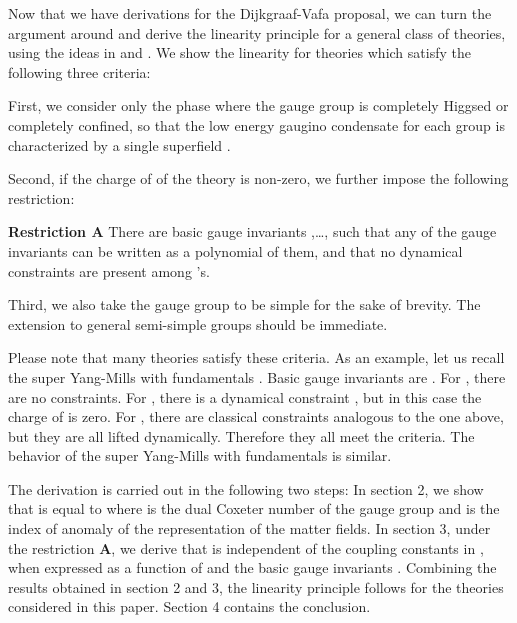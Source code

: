 \documentclass[a4paper,12pt]{article}
\def\ex#1{\langle#1\rangle}
\def\W#1{W_{\text{#1}}}
\def\Pf{\mathop{\text{Pf}}}
\begin{document}
Now that we have derivations for the Dijkgraaf-Vafa proposal,
we can turn the argument around and 
derive the linearity principle 
for a general class of theories,
using the ideas in \cite{Dijkgraaf:2002xd} and
\cite{Cachazo:2002ry}.
We show the linearity for theories which
satisfy the following three criteria:

First, we consider only the phase where the gauge group is completely Higgsed
or completely confined, so that the low energy gaugino condensate
for each group is characterized by a single superfield \coordHE{}.

Second, if the \coordHE{} charge of \myHighlight{$\Lambda$}\coordHE{}
of the theory is non-zero, 
we further impose the following restriction: %

\noindent\textbf{Restriction A}\quad
There are \coordHE{} basic gauge invariants \coordHE{},\ldots,\coordHE{}
such that any of the gauge invariants \coordHE{} can be
written as a polynomial of them,
and that no dynamical constraints \myHighlight{$P(\ex{F_1},\ex{F_2},\ldots,\ex{F_r})=0$}\coordHE{}
are present among \coordHE{}'s.

Third, we also take the gauge group to be simple
for the sake of brevity. The extension to general semi-simple groups
should be immediate. 

Please note that many theories satisfy these criteria.
As an example, let us recall the \coordHE{} super Yang-Mills
 with \coordHE{} fundamentals \coordHE{}.
Basic gauge invariants are \coordHE{}.
For \coordHE{}, there are no constraints.
For \coordHE{}, there is a dynamical constraint \myHighlight{$\Pf T_{ij}=\Lambda^{2N_f}$}\coordHE{},
but in this case the \coordHE{} charge of \myHighlight{$\Lambda$}\coordHE{} is zero.
For \coordHE{}, there are classical constraints analogous to the one above,
but they are all lifted dynamically.
Therefore they all meet the criteria.
The behavior of the \coordHE{} super Yang-Mills 
with fundamentals is similar.



The derivation  is carried out in the following two steps:
In section 2, we show that %
\myHighlight{$\W{n.p.}$}\coordHE{} is equal to \coordHE{} where \coordHE{} is the dual Coxeter number
of the gauge group and \coordHE{} is the index of anomaly of
the representation of the matter fields. 
In section 3, under the restriction \textbf{A},
we derive that \coordHE{} is
independent of the coupling constants \coordHE{} in \myHighlight{$\W{tree}$}\coordHE{},
 when expressed as a function of 
\myHighlight{$\Lambda$}\coordHE{} and the basic gauge invariants \myHighlight{$\ex{F_i}$}\coordHE{}.
Combining the results obtained in section 2 and 3,
the linearity principle follows for the theories considered in this paper.
Section 4 contains the conclusion.
\end{document}
